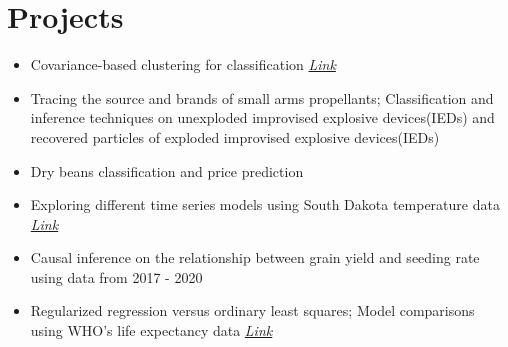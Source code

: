 \documentclass[letterpaper,11pt]{article}
\newcommand{\resumeItem}[2]{
  \item[]\normalsize{
    {#1}{ #2 \vspace{-2pt}}
  }
}
\newcommand{\resumeSubItem}[2]{\resumeItem{#1}{#2}\vspace{-4pt}}
\newcommand{\resumeSubHeadingListStart}{\begin{itemize}[leftmargin=0pt]}
\newcommand{\resumeSubHeadingListEnd}{\end{itemize}}
\begin{document}
\section{Projects}
\resumeSubHeadingListStart
\item Covariance-based clustering for classification \qquad \qquad \qquad \hspace{7cm} \href{https://github.com/TheoAnim/Clustering-and-Classification}{\textit{Link}}\vspace{-10pt}
\item Tracing the source and brands of small arms propellants; Classification and inference techniques on unexploded improvised explosive devices(IEDs) and recovered particles of exploded improvised explosive devices(IEDs)\vspace{-10pt}
\item Dry beans classification and price prediction\vspace{-10pt}
\item Exploring different time series models using South Dakota temperature data \hspace{4cm} \href{https://github.com/TheoAnim/Time-Series-Project/blob/main/README.md}{\textit{Link}}\vspace{-10pt}
\item Causal inference on the relationship between grain yield and seeding rate using data from 2017 - 2020\vspace{-10pt}
\item Regularized regression versus ordinary least squares; Model comparisons using WHO's life expectancy data {\href{https://github.com/TheoAnim/-Modeling-Life-Expectancy}{\textit{Link}}}
\resumeSubHeadingListEnd


\end{document}
